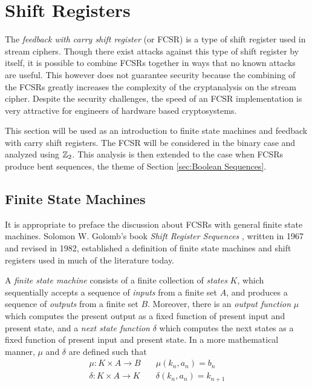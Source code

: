 \section{Shift Registers}
\par The {\it feedback with carry shift register} (or FCSR) is a type of
shift register used in stream ciphers. Though there exist attacks against
this type of shift register by itself, it is possible to combine FCSRs
together in ways that no known attacks are useful. This however does not
guarantee security because the combining of the FCSRs greatly increases the
complexity of the cryptanalysis on the stream cipher. Despite the security
challenges, the speed of an FCSR implementation is very attractive for
engineers of hardware based cryptosystems.

\par This section will be used as an introduction to finite state machines
and feedback with carry shift registers. The FCSR will be considered in the
binary case and analyzed using $\mathbb{Z}_2$. This analysis is then extended to
the case when FCSRs produce bent sequences, the theme of Section
\ref{sec:Boolean Sequences}.

\subsection{Finite State Machines}
\par It is appropriate to preface the discussion about FCSRs with general finite
state machines. Solomon W. Golomb's book {\em Shift Register Sequences}
\cite{bk:g82}, written in 1967 and revised in 1982, established a definition of
finite state machines and shift registers used in much of the literature today.


\begin{definition}\label{finite-state-machine}
  A {\em finite state machine} consists of a finite collection of {\em states}
  $K$, which sequentially accepts a sequence of {\em inputs} from a finite set
  $A$, and produces a sequence of {\em outputs} from a finite set
  $B$. Moreover, there is an {\em output function} $\mu$ which computes
  the present output as a fixed function of present input and present state,
  and a
  {\em next state function} $\delta$ which computes the next states as a fixed
  function of present input and present state. In a more mathematical manner,
  $\mu$ and $\delta$ are defined such that
  \begin{eqnarray}
    \mu:K \times A \rightarrow B \quad &\mu(k_n,a_n)=b_n \\
    \delta:K \times A \rightarrow K \quad &\delta(k_n,a_n)=k_{n+1}
  \end{eqnarray}
\end{definition}

